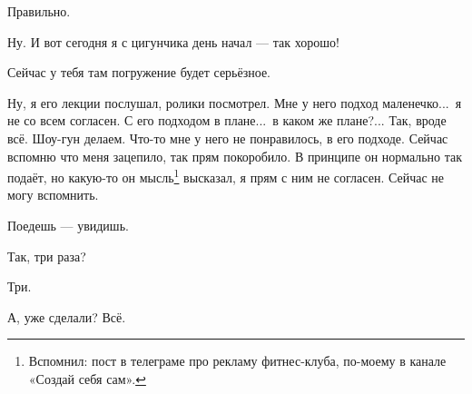 \M
Правильно.

\I
Ну. И вот сегодня я с цигунчика день начал --- так хорошо!

\M
Сейчас у тебя там погружение будет серьёзное.

\I
Ну, я его лекции послушал, ролики посмотрел.
Мне у него подход маленечко...\ я не со всем согласен.
С его подходом в плане...\ в каком же плане?...
Так, вроде всё. Шоу-гун делаем.
Что-то мне у него не понравилось, в его подходе.
Сейчас вспомню что меня зацепило, так прям покоробило.
В принципе он нормально так подаёт, но какую-то он мысль\footnote*{Вспомнил:
пост в телеграме про рекламу фитнес-клуба, по-моему в канале «Создай себя сам».}
высказал, я прям с ним не согласен.
Сейчас не могу вспомнить.

\M
Поедешь --- увидишь.

\I
Так, три раза?

\M
Три.

\I
А, уже сделали? Всё.

